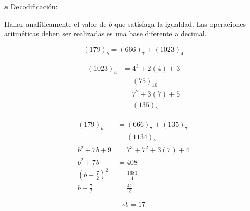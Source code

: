 \documentclass{article}
\newenvironment{problem}[2][Problema]{\begin{trivlist}
\item[\hskip \labelsep {\bfseries #1}\hskip \labelsep {\bfseries #2.}]}{\end{trivlist}}
\newenvironment{solution}[1][Solución]{\begin{trivlist}
\item[\hskip \labelsep {\bfseries #1:}]}{\end{trivlist}}
\begin{document}
\begin{solution}{\textbf{a} Decodificación:}
\begin{center}
\end{center}
\end{solution}


\begin{problem}{4}
    Hallar analíticamente el valor de $b$ que satisfaga la igualdad. Las operaciones aritméticas deben ser realizadas es una base diferente a decimal.
    
    $$(179)_{b} = (666)_{7} + (1023)_{4} $$
\end{problem}

\begin{solution}
    \begin{align*}
        (1023)_{4} &= 4^{3} + 2(4) + 3\\
         &= (75)_{10}  \\
         &= 7^2 + 3(7) + 5 \\
         &= (135)_{7}
    \end{align*}

    \begin{align*}
        (179)_{b} &= (666)_7 + (135)_{7} \\
        &= (1134)_7 \\
        b^{2} + 7b + 9 &= 7^{3} + 7^{2} + 3(7) + 4 \\
        b^{2} + 7b &= 408 \\
        \left(b + \frac{7}{2}\right)^{2} &= \frac{1681}{4} \\
        b + \frac{7}{2} &= \frac{41}{2} 
    \end{align*}

    \begin{equation*}
        \boxed{
            \therefore b = 17
        }
    \end{equation*}
\end{solution}
\end{document}

